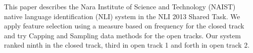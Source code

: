 This paper describes the Nara Institute of Science and Technology (NAIST) native language identification (NLI) system in the NLI 2013 Shared Task. We
 apply feature selection using a measure based on frequency for the closed track
 and try Capping and Sampling data methods for the open tracks. Our system
 ranked ninth in the closed track, third in open track 1 and forth in open track
 2.

